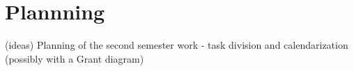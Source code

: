 \chapter{Plannning}
\label{chapter:planning}

{\color{gray}
(ideas) Planning of the second semester work - task division and calendarization (possibly with a Grant diagram)
}